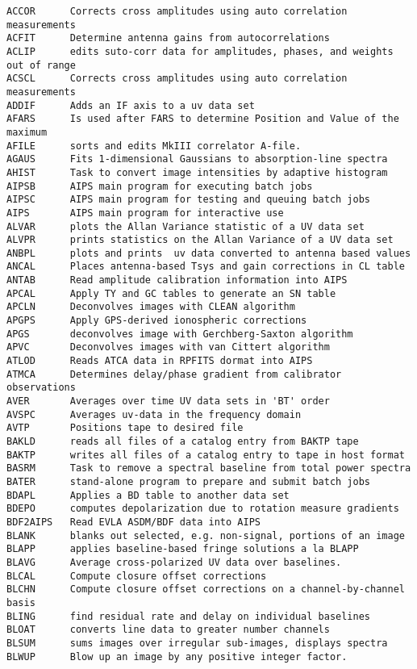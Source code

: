 \begin{verbatim}
ACCOR      Corrects cross amplitudes using auto correlation measurements
ACFIT      Determine antenna gains from autocorrelations
ACLIP      edits suto-corr data for amplitudes, phases, and weights out of range
ACSCL      Corrects cross amplitudes using auto correlation measurements
ADDIF      Adds an IF axis to a uv data set
AFARS      Is used after FARS to determine Position and Value of the maximum
AFILE      sorts and edits MkIII correlator A-file.
AGAUS      Fits 1-dimensional Gaussians to absorption-line spectra
AHIST      Task to convert image intensities by adaptive histogram
AIPSB      AIPS main program for executing batch jobs
AIPSC      AIPS main program for testing and queuing batch jobs
AIPS       AIPS main program for interactive use
ALVAR      plots the Allan Variance statistic of a UV data set
ALVPR      prints statistics on the Allan Variance of a UV data set
ANBPL      plots and prints  uv data converted to antenna based values
ANCAL      Places antenna-based Tsys and gain corrections in CL table
ANTAB      Read amplitude calibration information into AIPS
APCAL      Apply TY and GC tables to generate an SN table
APCLN      Deconvolves images with CLEAN algorithm
APGPS      Apply GPS-derived ionospheric corrections
APGS       deconvolves image with Gerchberg-Saxton algorithm
APVC       Deconvolves images with van Cittert algorithm
ATLOD      Reads ATCA data in RPFITS dormat into AIPS
ATMCA      Determines delay/phase gradient from calibrator observations
AVER       Averages over time UV data sets in 'BT' order
AVSPC      Averages uv-data in the frequency domain
AVTP       Positions tape to desired file
BAKLD      reads all files of a catalog entry from BAKTP tape
BAKTP      writes all files of a catalog entry to tape in host format
BASRM      Task to remove a spectral baseline from total power spectra
BATER      stand-alone program to prepare and submit batch jobs
BDAPL      Applies a BD table to another data set
BDEPO      computes depolarization due to rotation measure gradients
BDF2AIPS   Read EVLA ASDM/BDF data into AIPS
BLANK      blanks out selected, e.g. non-signal, portions of an image
BLAPP      applies baseline-based fringe solutions a la BLAPP
BLAVG      Average cross-polarized UV data over baselines.
BLCAL      Compute closure offset corrections
BLCHN      Compute closure offset corrections on a channel-by-channel basis
BLING      find residual rate and delay on individual baselines
BLOAT      converts line data to greater number channels
BLSUM      sums images over irregular sub-images, displays spectra
BLWUP      Blow up an image by any positive integer factor.

\end{verbatim}
